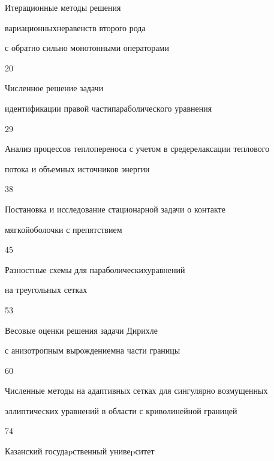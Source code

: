 

{Итерационные методы решения


вариационных\newline неравенств второго рода


с обратно сильно монотонными операторами}{20}




{Численное решение задачи


идентификации правой части\newline параболического уравнения}{29}




{Анализ процессов теплопереноса с учетом в среде\newline релаксации теплового


потока и объемных источников энергии}{38}




{Постановка и исследование стационарной задачи о контакте


мягкой\newline оболочки с препятствием}{45}




{Разностные схемы для параболических\newline уравнений


на треугольных сетках}{53}




{Весовые оценки решения задачи Дирихле


с анизотропным вырождением\newline на части границы}{60}




{Численные методы на адаптивных сетках для сингулярно возмущенных\newline


эллиптических уравнений в области с криволинейной границей}{74}




























\vfill


\noindent\raisebox{2pt}{\copyright} Казанский госудаpственный унивеpситет





